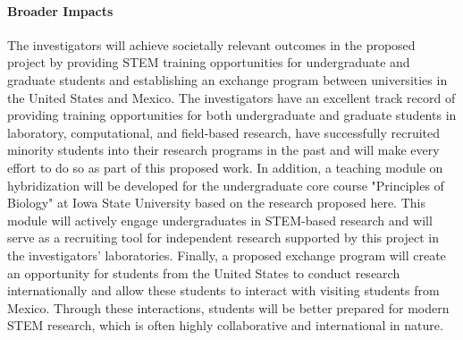 
\paragraph{Broader Impacts}

The investigators will achieve societally relevant outcomes in the proposed project by providing STEM training opportunities for undergraduate and graduate students and establishing an exchange program between universities in the United States and Mexico.
The investigators have an excellent track record of providing training opportunities for both undergraduate and graduate students in laboratory, computational, and field-based research, have successfully recruited minority students into their research programs in the past and will make every effort to do so as part of this proposed work.
In addition, a teaching module on hybridization will be developed for the undergraduate core course "Principles of Biology" at Iowa State University based on the research proposed here.
This module will actively engage undergraduates in STEM-based research and will serve as a recruiting tool for independent research supported by this project in the investigators' laboratories.
Finally, a proposed exchange program will create an opportunity for students from the United States to conduct research internationally and allow these students to interact with visiting students from Mexico. Through these interactions, students will be better prepared for modern STEM research, which is often highly collaborative and international in nature.

